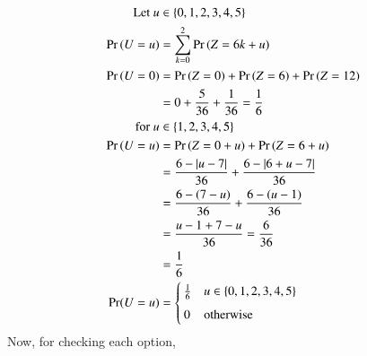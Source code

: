 \begin{align}
    \text{Let } u &\in \{0, 1, 2, 3, 4, 5\}
    \\\Pr{(U=u)} &= \sum_{k=0}^2\Pr{(Z = 6k+u)}
    \\\Pr{(U=0)} &= \Pr{(Z = 0)} + \Pr{(Z = 6)} + \Pr{(Z = 12)}
    \\ &= 0 + \frac{5}{36} + \frac{1}{36} = \frac{1}{6}
    \\ \text{for } u &\in \{1, 2, 3, 4, 5\}
    \\\Pr{(U=u)} &= \Pr{(Z = 0+u)} + \Pr{(Z = 6+u)}
    \\&= \frac{6 - \left\vert u-7\right\vert}{36} +  \frac{6 - \left\vert6+u-7\right\vert}{36}
    \\&= \frac{6 - (7-u)}{36} +  \frac{6 - (u-1)}{36}
    \\&= \frac{u - 1 + 7 - u}{36} = \frac{6}{36}
    \\&=\frac{1}{6}
    \\\Pr(U=u) &= 
	\begin{cases}
    \frac{1}{6}   &  u \in \{0, 1, 2, 3, 4, 5\}\\ ~\\[-1em]
	0 & \text{otherwise}
	\end{cases}
\end{align}
Now, for checking each option,
